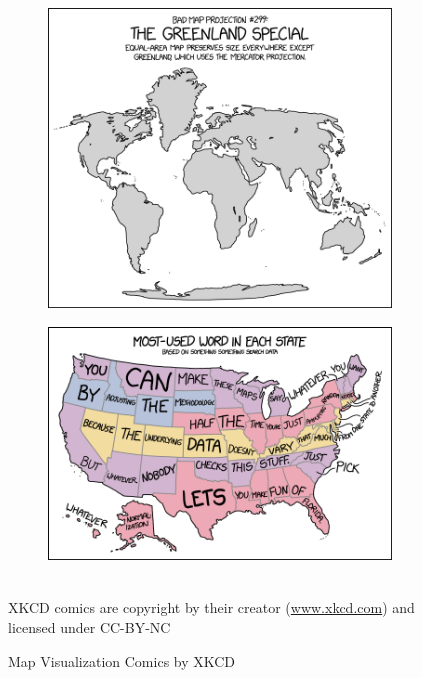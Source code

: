 \begin{figure}
\begin{subfigure}{.49\textwidth}
\end{subfigure}
\hfill
\begin{subfigure}{.49\textwidth}
\centering
  \includegraphics[width=\textwidth]{xkcd_bad_map_projection_the_greenland_special.png}
\end{subfigure}
\hfill
\begin{subfigure}{.49\textwidth}
\centering
  \includegraphics[width=\textwidth]{xkcd_state_word_map.png}
\end{subfigure} \\ 
\tiny \scriptsize{XKCD comics are copyright by their creator (\url{www.xkcd.com}) and licensed under CC-BY-NC}

\caption{Map Visualization Comics by XKCD}
\label{fig:xkcdmaps}
\end{figure}

